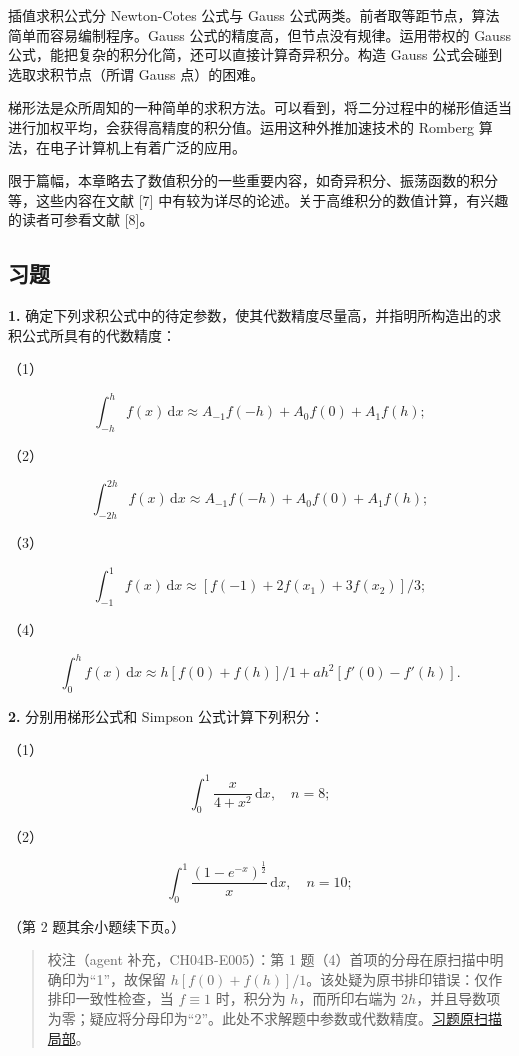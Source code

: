 \documentclass[
  10pt,
  fontset=fandol]{ctexart}
\begin{document}
插值求积公式分 Newton-Cotes 公式与 Gauss 公式两类。前者取等距节点，算法简单而容易编制程序。Gauss 公式的精度高，但节点没有规律。运用带权的 Gauss 公式，能把复杂的积分化简，还可以直接计算奇异积分。构造 Gauss 公式会碰到选取求积节点（所谓 Gauss 点）的困难。

梯形法是众所周知的一种简单的求积方法。可以看到，将二分过程中的梯形值适当进行加权平均，会获得高精度的积分值。运用这种外推加速技术的 Romberg 算法，在电子计算机上有着广泛的应用。

限于篇幅，本章略去了数值积分的一些重要内容，如奇异积分、振荡函数的积分等，这些内容在文献 {[}7{]} 中有较为详尽的论述。关于高维积分的数值计算，有兴趣的读者可参看文献 {[}8{]}。

\subsection{习题}\label{ux4e60ux9898}

\textbf{1.} 确定下列求积公式中的待定参数，使其代数精度尽量高，并指明所构造出的求积公式所具有的代数精度：

（1）

\[
\int_{-h}^{h}f(x)\,\mathrm{d}x\approx A_{-1}f(-h)+A_0f(0)+A_1f(h);
\]

（2）

\[
\int_{-2h}^{2h}f(x)\,\mathrm{d}x\approx A_{-1}f(-h)+A_0f(0)+A_1f(h);
\]

（3）

\[
\int_{-1}^{1}f(x)\,\mathrm{d}x\approx[f(-1)+2f(x_1)+3f(x_2)]/3;
\]

（4）

\[
\int_0^h f(x)\,\mathrm{d}x\approx h[f(0)+f(h)]/1+ah^2[f'(0)-f'(h)].
\]

\textbf{2.} 分别用梯形公式和 Simpson 公式计算下列积分：

（1）

\[
\int_0^1\frac{x}{4+x^2}\,\mathrm{d}x,\quad n=8;
\]

（2）

\[
\int_0^1\frac{(1-e^{-x})^{\frac12}}{x}\,\mathrm{d}x,\quad n=10;
\]

（第 2 题其余小题续下页。）

\begin{quote}
校注（agent 补充，CH04B-E005）：第 1 题（4）首项的分母在原扫描中明确印为``1''，故保留 \(h[f(0)+f(h)]/1\)。该处疑为原书排印错误：仅作排印一致性检查，当 \(f\equiv1\) 时，积分为 \(h\)，而所印右端为 \(2h\)，并且导数项为零；疑应将分母印为``2''。此处不求解题中参数或代数精度。\href{../assets/ch04b/review-p117-exercises.png}{习题原扫描局部}。
\end{quote}
\end{document}
